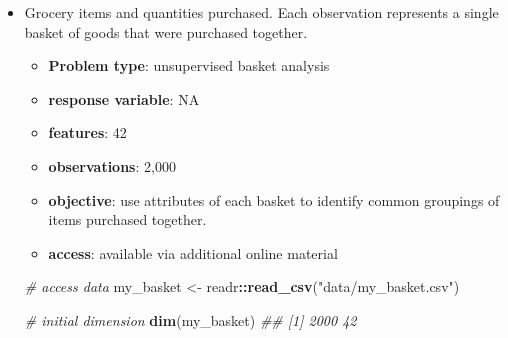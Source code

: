 \documentclass[]{krantz}
\makeatletter
\newenvironment{Shaded}{\begin{snugshade}}{\end{snugshade}}
\newcommand{\CommentTok}[1]{\textcolor[rgb]{0.37,0.37,0.37}{\textit{#1}}}
\newcommand{\KeywordTok}[1]{\textcolor[rgb]{0.27,0.27,0.27}{\textbf{#1}}}
\newcommand{\NormalTok}[1]{#1}
\newcommand{\OperatorTok}[1]{\textcolor[rgb]{0.43,0.43,0.43}{\textbf{#1}}}
\newcommand{\StringTok}[1]{\textcolor[rgb]{0.5,0.5,0.5}{#1}}
\providecommand{\tightlist}{%
  \setlength{\itemsep}{0pt}\setlength{\parskip}{0pt}}
\newenvironment{kframe}{%
\medskip{}
\setlength{\fboxsep}{.8em}
 \def\at@end@of@kframe{}%
 \ifinner\ifhmode%
  \def\at@end@of@kframe{\end{minipage}}%
  \begin{minipage}{\columnwidth}%
 \fi\fi%
 \def\FrameCommand##1{\hskip\@totalleftmargin \hskip-\fboxsep
 \colorbox{shadecolor}{##1}\hskip-\fboxsep
     \hskip-\linewidth \hskip-\@totalleftmargin \hskip\columnwidth}%
 \MakeFramed {\advance\hsize-\width
   \@totalleftmargin\z@ \linewidth\hsize
   \@setminipage}}%
 {\par\unskip\endMakeFramed%
 \at@end@of@kframe}
\renewenvironment{Shaded}{\begin{kframe}}{\end{kframe}}
\makeatother
\begin{document}
\begin{itemize}
\begin{Shaded}
\end{Shaded}
\item
  Grocery items and quantities purchased. Each observation represents a single basket of goods that were purchased together.

  \begin{itemize}
  \tightlist
  \item
    \textbf{Problem type}: unsupervised basket analysis
  \item
    \textbf{response variable}: NA
  \item
    \textbf{features}: 42
  \item
    \textbf{observations}: 2,000
  \item
    \textbf{objective}: use attributes of each basket to identify common groupings of items purchased together.
  \item
    \textbf{access}: available via additional online material
  \end{itemize}

\begin{Shaded}
\begin{Highlighting}[]
\CommentTok{# access data}
\NormalTok{my_basket <-}\StringTok{ }\NormalTok{readr}\OperatorTok{::}\KeywordTok{read_csv}\NormalTok{(}\StringTok{"data/my_basket.csv"}\NormalTok{)}

\CommentTok{# initial dimension}
\KeywordTok{dim}\NormalTok{(my_basket)}
\CommentTok{## [1] 2000   42}


\end{Highlighting}
\end{Shaded}
\end{itemize}
\end{document}
